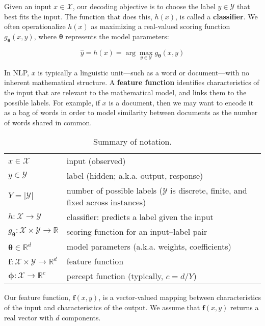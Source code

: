 \documentclass[11pt,letterpaper]{article}
\newcommand{\params}{\mathbf{\theta}}
\begin{document}
Given an input $x \in \mathcal{X}$, our decoding objective is 
to choose the label $y \in \mathcal{Y}$ that best fits the input. 
The function that does this, $h(x)$, is called a \textbf{classifier}.
We often operationalize $h(x)$ as maximizing a real-valued scoring function $g_\params(x,y)$, 
where $\params$ represents the model parameters: 

\begin{equation}\label{eq:classifier}
\hat{y} = h(x) = \arg\max_{y\in\mathcal{Y}} g_\params(x,y)
\end{equation}

In NLP, $x$ is typically a linguistic unit---such as a word or document---with no inherent mathematical structure. 
A {\bf feature function} identifies characteristics of the input that are relevant to the mathematical model, 
and links them to the possible labels. 
For example, if $x$ is a document, then we may want to encode it as a bag of words 
in order to model similarity between documents as the number of words shared in common.

\begin{table*}\small
\begin{tabular}{ll}
$x \in \mathcal{X}$ & input (observed) \\
$y \in \mathcal{Y}$ & label (hidden; a.k.a. output, response) \\
$Y = |\mathcal{Y}|$ & number of possible labels ($\mathcal{Y}$ is discrete, finite, and fixed across instances) \\
$h: \mathcal{X}\rightarrow\mathcal{Y}$ & classifier: predicts a label given the input \\
$g_\params: \mathcal{X}\times\mathcal{Y}\rightarrow\mathbb{R}$ & scoring function for an input--label pair \\
$\boldsymbol{\theta} \in \mathbb{R}^d$ & model parameters (a.k.a. weights, coefficients) \\
$\mathbf{f}: \mathcal{X}\times\mathcal{Y}\rightarrow\mathbb{R}^d$ & feature function \\
$\boldsymbol{\phi}: \mathcal{X}\rightarrow\mathbb{R}^c$ & percept function (typically, $c = d/Y$) \\
\end{tabular}
\caption{Summary of notation.}
\label{tbl:notation}
\end{table*}


Our feature function, $\mathbf{f}(x,y)$, is a vector-valued mapping between 
characteristics of the input and characteristics of the output.
We assume that $\mathbf{f}(x,y)$ returns a real vector with $d$ components.
\end{document}
